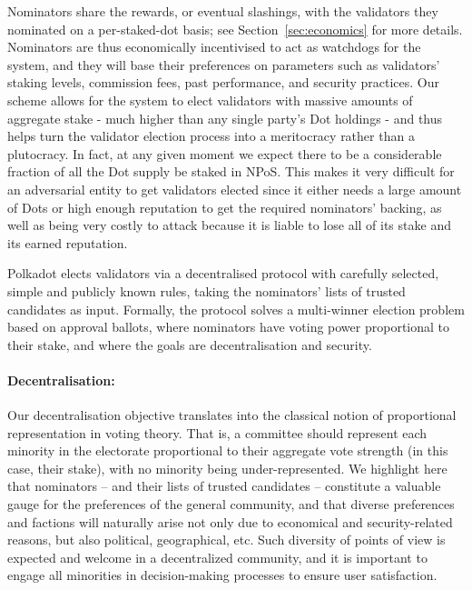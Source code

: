 Nominators share the rewards, or eventual slashings, with the validators they nominated on a per-staked-dot basis; 
see Section~\ref{sec:economics} for more details. 
Nominators are thus economically incentivised to act as watchdogs for the system, and they will base their preferences 
on parameters such as validators' staking levels, commission fees, past performance, and security practices.
Our scheme allows for the system to elect validators with massive amounts of aggregate stake
- much higher than any single party's Dot holdings -
and thus helps turn the validator election process into a meritocracy rather than a plutocracy.
In fact, at any given moment we expect there to be a considerable fraction of all the Dot supply be staked in NPoS.
This makes it very difficult for an adversarial entity to get validators elected since it either needs a large amount of Dots or high enough reputation to get the required nominators' backing,
 as well as being very costly to attack because it is liable to lose all of its stake and its earned reputation.

Polkadot elects validators via a decentralised protocol with carefully selected, simple and publicly known rules,
taking the nominators' lists of trusted candidates as input. Formally, the protocol solves a multi-winner election
problem based on approval ballots, where nominators have voting power proportional to their stake,
and where the goals are decentralisation and security.

\paragraph{Decentralisation:}  
Our decentralisation objective translates into the classical notion of proportional representation in voting theory.
That is, a committee should represent each minority in the electorate proportional to their aggregate vote strength (in this case, their stake), with no minority being under-represented. 
We highlight here that nominators -- and their lists of trusted candidates -- constitute a valuable gauge for the preferences of the general community, and that diverse preferences and factions will naturally arise not only due to economical and security-related reasons, but also political, geographical, etc. Such diversity of points of view is expected and welcome in a decentralized community, and it is important to engage all minorities in decision-making processes to ensure user satisfaction. 

